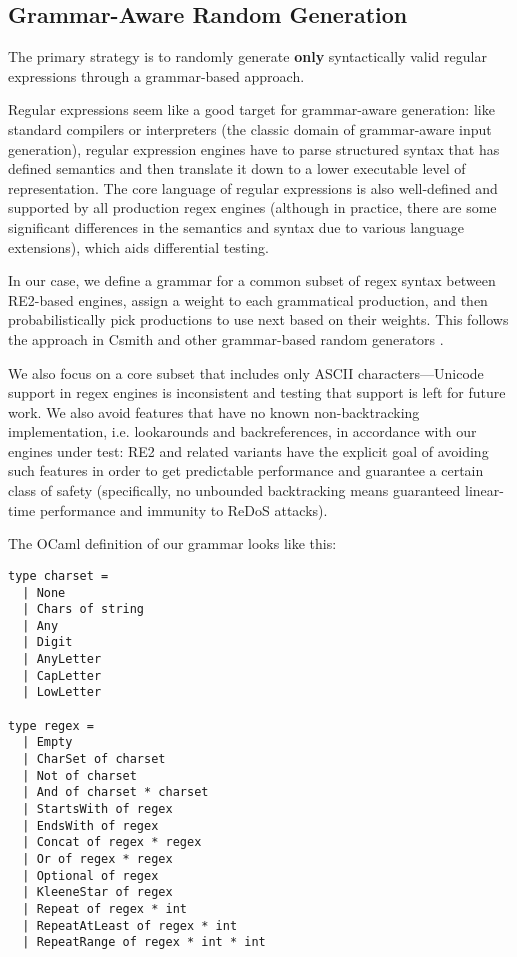 \documentclass[acmsmall,nonacm,screen]{acmart}
\begin{document}
\subsection{Grammar-Aware Random Generation}
The primary strategy is to randomly generate \textbf{only} syntactically valid regular expressions through a grammar-based approach.

Regular expressions seem like a good target for grammar-aware generation: like standard compilers or interpreters (the classic domain of grammar-aware input generation), regular expression engines have to parse structured syntax that has defined semantics and then translate it down to a lower executable level of representation. The core language of regular expressions is also well-defined and supported by all production regex engines (although in practice, there are some significant differences in the semantics and syntax due to various language extensions), which aids differential testing.

In our case, we define a grammar for a common subset of regex syntax between RE2-based engines, assign a weight to each grammatical production, and then probabilistically pick productions to use next based on their weights. This follows the approach in Csmith and other grammar-based random generators \cite{yang2011finding, godefroid2008grammar}.

We also focus on a core subset that includes only ASCII characters—Unicode support in regex engines is inconsistent and testing that support is left for future work. We also avoid features that have no known non-backtracking implementation, i.e. lookarounds and backreferences, in accordance with our engines under test: RE2 and related variants have the explicit goal of avoiding such features in order to get predictable performance and guarantee a certain class of safety (specifically, no unbounded backtracking means guaranteed linear-time performance and immunity to ReDoS attacks).

The OCaml definition of our grammar looks like this:
\begin{verbatim}
type charset =
  | None
  | Chars of string
  | Any
  | Digit
  | AnyLetter
  | CapLetter
  | LowLetter

type regex =
  | Empty
  | CharSet of charset
  | Not of charset
  | And of charset * charset
  | StartsWith of regex
  | EndsWith of regex
  | Concat of regex * regex
  | Or of regex * regex
  | Optional of regex
  | KleeneStar of regex
  | Repeat of regex * int
  | RepeatAtLeast of regex * int
  | RepeatRange of regex * int * int
\end{verbatim}
\end{document}
